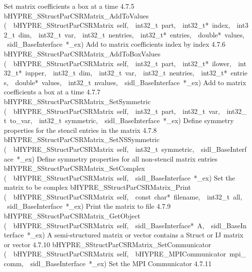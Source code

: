 \documentclass{article}
\begin{document}
\begin{cxxentry}
\begin{cxxentry}
\begin{cxxnames}
        {
Set matrix coefficients a box at a time}
        {4.7.5}
        {bHYPRE\_SStructParCSRMatrix\_AddToValues}
        {(\ \ bHYPRE\_SStructParCSRMatrix\ self,\ \ int32\_t\ part,\ \ int32\_t*\ index,\ \ int32\_t\ dim,\ \ int32\_t\ var,\ \ int32\_t\ nentries,\ \ int32\_t*\ entries,\ \ double*\ values,\ \ sidl\_BaseInterface\ *\_ex)}
        {
Add to matrix coefficients index by index}
        {4.7.6}
        {bHYPRE\_SStructParCSRMatrix\_AddToBoxValues}
        {(\ \ bHYPRE\_SStructParCSRMatrix\ self,\ \ int32\_t\ part,\ \ int32\_t*\ ilower,\ \ int32\_t*\ iupper,\ \ int32\_t\ dim,\ \ int32\_t\ var,\ \ int32\_t\ nentries,\ \ int32\_t*\ entries,\ \ double*\ values,\ \ int32\_t\ nvalues,\ \ sidl\_BaseInterface\ *\_ex)}
        {
Add to matrix coefficients a box at a time}
        {4.7.7}
        {bHYPRE\_SStructParCSRMatrix\_SetSymmetric}
        {(\ \ bHYPRE\_SStructParCSRMatrix\ self,\ \ int32\_t\ part,\ \ int32\_t\ var,\ \ int32\_t\ to\_var,\ \ int32\_t\ symmetric,\ \ sidl\_BaseInterface\ *\_ex)}
        {
Define symmetry properties for the stencil entries in the
matrix}
        {4.7.8}
        {bHYPRE\_SStructParCSRMatrix\_SetNSSymmetric}
        {(\ \ bHYPRE\_SStructParCSRMatrix\ self,\ \ int32\_t\ symmetric,\ \ sidl\_BaseInterface\ *\_ex)}
        {
Define symmetry properties for all non-stencil matrix
entries}
        {}
\label{cxx.4.7.19}
        {bHYPRE\_SStructParCSRMatrix\_SetComplex}
        {(\ \ bHYPRE\_SStructParCSRMatrix\ self,\ \ sidl\_BaseInterface\ *\_ex)}
        {
Set the matrix to be complex}
        {}
\label{cxx.4.7.20}
        {bHYPRE\_SStructParCSRMatrix\_Print}
        {(\ \ bHYPRE\_SStructParCSRMatrix\ self,\ \ const\ char*\ filename,\ \ int32\_t\ all,\ \ sidl\_BaseInterface\ *\_ex)}
        {
Print the matrix to file}
        {4.7.9}
        {bHYPRE\_SStructParCSRMatrix\_GetObject}
        {(\ \ bHYPRE\_SStructParCSRMatrix\ self,\ \ sidl\_BaseInterface*\ A,\ \ sidl\_BaseInterface\ *\_ex)}
        {
A semi-structured matrix or vector contains a Struct or IJ matrix
or vector}
        {4.7.10}
        {bHYPRE\_SStructParCSRMatrix\_SetCommunicator}
        {(\ \ bHYPRE\_SStructParCSRMatrix\ self,\ \ bHYPRE\_MPICommunicator\ mpi\_comm,\ \ sidl\_BaseInterface\ *\_ex)}
        {
Set the MPI Communicator}
        {4.7.11}

\end{cxxnames}
\end{cxxentry}
\end{cxxentry}
\end{document}
